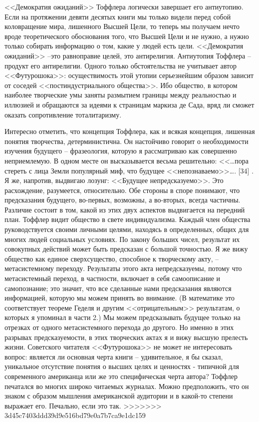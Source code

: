 \documentclass{book}
\begin{document}
{<<Демократия ожиданий>> Тоффлера логически завершает его антиутопию. Если на протяжении девяти десятых книги мы только видели перед собой коловращение мира, лишенного Высшей Цели, то теперь мы получаем нечто вроде теоретиче­ского обоснования того, что Высшей Цели и не нужно, а нужно только собирать информацию о том, какие у людей есть  цели. <<Демократия ожиданий>> --это равноправие целей, это анти­религия. Антиутопия Тоффлера -- продукт его антирелигии. Одного только обстоятельства не учитывает автор <<Футурошока>>: осуществимость этой утопии серьезнейшим образом за­висит от соседей <<постиндустриального общества>>. Ибо общест­во, в котором наиболее творческие умы заняты размытием гра­ницы между реальностью и иллюзией и обращаются за идеями к страницам маркиза де Сада, вряд ли сможет оказать сопротив­ление тоталитаризму.

Интересно отметить, что концепция Тоффлера, как и всякая концепция, лишенная понятия творчества, детерминистична. Он настойчиво говорит о необходимости изучения  будущего -- фразеология, которую я рассматриваю как совершенно непри­емлемую. В одном месте он высказывается весьма решитель­но: <<\ldots пора стереть с лица Земли популярный миф, что буду­щее <<непознаваемо>>\ldots. [34] . Я же, напротив, выдвигаю лозунг: <<Будущее непредсказуемо>>. Это расхождение, разумеется, от­носительно. Обе стороны в споре понимают, что предсказания будущего, во-первых, возможны, а во-вторых, всегда частичны. Различие состоит в том, какой из этих двух аспектов выд­вигается на передний план. Тоффлер видит общество в свете индивидуализма. Каждый член общества руководствуется своими личными целями, находясь в определенных, общих для многих людей социальных условиях. По закону больших чисел, результат их совокупных действий может быть предсказан с большой точностью. Я же вижу общество как единое сверх­существо, способное к творческому 
акту, -- метасистемному пе­реходу. Результаты этого акта непредсказуемы, потому что метасистемный переход, в частности, включает в себя самоописа­ние  и самопознание;  это значит, что все сделанные нами пред­сказания являются информацией, которую мы можем принять во внимание. (В математике это соответствует теореме Геделя и другим <<отрицательным>> результатам, о которых я упоминал в части 2.) Мы можем предсказывать будущее только на отрез­ках от одного метасистемного перехода до другого. Но именно в этих разрывах предсказуемости, в этих творческих актах я и вижу высшую прелесть жизни.
Советского читателя <<Футурошока>> не может не интересо­вать вопрос: является ли основная черта книги -- удивительное, я бы сказал, уникальное  отсутствие понятия о высших целях и ценностях - типичной для современного американца или же это специфическая черта автора? Тоффлер печатался во многих широко читаемых журналах. Можно предположить, что он зна­ком с образом мышления американской аудитории и в какой-то степени выражает его. Печально, если это так.
>>>>>>> 3d45c7403ddd39d9e516bd79e0a7b7ca9e1dc159


}
\end{document}
